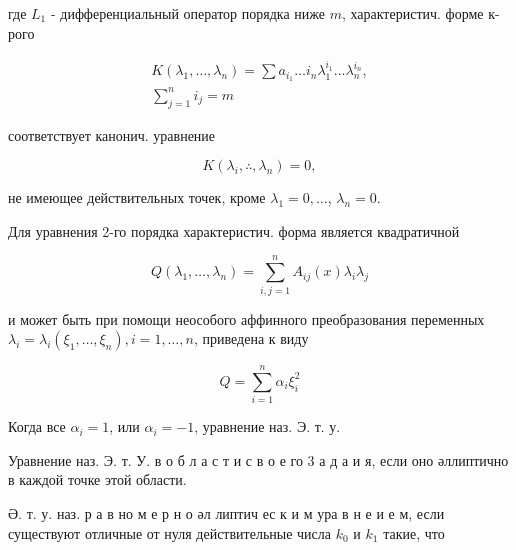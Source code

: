 \documentclass[10pt]{article}
\begin{document}
где $L_{1}$ - дифференциальный оператор порядка ниже $m$, характеристич. форме к-рого



\[

\begin{gathered}

K\left(\lambda_{1}, \ldots, \lambda_{n}\right)=\sum a_{i_{1}} \ldots i_{n} \lambda_{1}^{i_{1}} \ldots \lambda_{n}^{i_{n}}, \\

\sum_{j=1}^{n} i_{j}=m

\end{gathered}

\]



соответствует канонич. уравнение



\[

K\left(\lambda_{i}, \therefore, \lambda_{n}\right)=0,

\]



не имеющее действительных точек, кроме $\lambda_{1}=0, \ldots$, $\lambda_{n}=0$.



Для уравнения 2-го порядка характеристич. форма является квадратичной



\[

Q\left(\lambda_{1}, \ldots, \lambda_{n}\right)=\sum_{i, j=1}^{n} A_{i j}(x) \lambda_{i} \lambda_{j}

\]



и может быть при помощи неособого аффинного преобразования переменных $\lambda_{i}=\lambda_{i}\left(\xi_{1}, \ldots, \xi_{n}\right), i=1, \ldots, n$, приведена к виду



\[

Q=\sum_{i=1}^{n} \alpha_{i} \xi_{i}^{2}

\]



Когда все $\alpha_{i}=1$, или $\alpha_{i}=-1$, уравнение наз. Э. т. у.



Уравнение наз. Э. т. У. в о б л а с т и с в о е го 3 а д а и я, если оно әллиптично в каждой точке этой области.



Ә. т. у. наз. р а в но м е р н о әл липтич ес к и м ура в н е и е м, если существуют отличные от нуля действительные числа $k_{0}$ и $k_{1}$ такие, что
\end{document}
